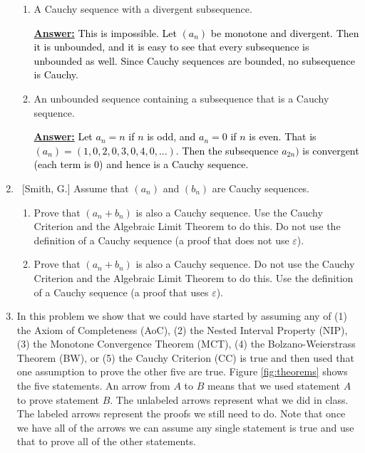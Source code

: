 \documentclass[10pt]{article}
\theoremstyle{definition}
\begin{document}
\begin{enumerate}
\begin{enumerate}
	\item  A Cauchy sequence with a divergent subsequence.
	
 \textbf{\underline{Answer:}}
   \textcolor{black}{This is impossible.  Let $(a_n)$ be monotone and divergent.  Then it is unbounded, and it is easy to see that every subsequence is unbounded as well.  Since Cauchy sequences are bounded, no subsequence is Cauchy.}
	\item  An unbounded sequence containing a subsequence that is a Cauchy sequence.
	
 \textbf{\underline{Answer:}}
   \textcolor{black}{Let $a_n = n$ if $n$ is odd, and $a_n=0$ if $n$ is even.  That is $(a_n) = (1, 0, 2, 0, 3, 0, 4, 0,...)$.  Then the subsequence $a_{2n})$ is convergent (each term is 0) and hence is a Cauchy sequence.}
	\end{enumerate}
	
	
\item  ~[Smith, G.] Assume that $(a_n)$ and $(b_n)$ are Cauchy sequences.

	\begin{enumerate}
	
	\item  Prove that $(a_n+b_n)$ is also a Cauchy sequence.  Use the Cauchy Criterion and the Algebraic Limit Theorem to do this.  Do not use the definition of a Cauchy sequence (a proof that does not use $\varepsilon$).
	
	\item  Prove that $(a_n+b_n)$ is also a Cauchy sequence.  Do not use the Cauchy Criterion and the Algebraic Limit Theorem to do this.  Use the definition of a Cauchy sequence (a proof that uses $\varepsilon$).
	
	\end{enumerate}
	

\item  In this problem we show that we could have started by assuming any of (1) the Axiom of Completeness (AoC), (2) the Nested Interval Property (NIP), (3) the Monotone Convergence Theorem (MCT), (4) the Bolzano-Weierstrass Theorem (BW), or (5) the Cauchy Criterion (CC) is true and then used that one assumption to prove the other five are true.  Figure \ref{fig:theorems} shows the five statements.  An arrow from $A$ to $B$ means that we used statement $A$ to prove statement $B$.  The unlabeled arrows represent what we did in class.  The labeled arrows represent the proofs we still need to do.  Note that once we have all of the arrows we can assume any single statement is true and use that to prove all of the other statements.


\end{enumerate}
\end{document}
